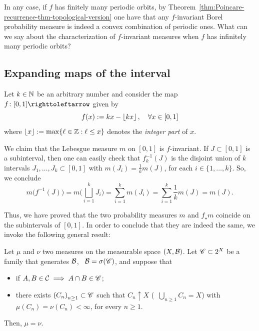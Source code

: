 In any case, if $f$ has finitely many periodic orbits, by Theorem~\ref{thm:Poincare-recurrence-thm-topological-version} one have that any $f$-invariant Borel probability measure is indeed a convex combination of periodic ones. What can we say about the characterization of $f$-invariant measures when $f$ has infinitely many periodic orbits?

\subsection{Expanding maps of the interval}\label{sec:expand-maps-interval}

Let $k\in\mathbb{N}$ be an arbitrary number and consider the map $f\colon [0,1]\carr$ given by
\begin{displaymath}
  f(x):=kx - \left\lfloor{kx}\right\rfloor, \quad\forall x\in [0,1]
\end{displaymath}
where $\left\lfloor{x}\right\rfloor:=\max\{\ell\in\mathbb{Z} : \ell\leq x\}$ denotes the \emph{integer part} of $x$.

We claim that the Lebesgue measure $m$ on $[0,1]$ is $f$-invariant. If $J\subset [0,1]$ is a subinterval, then one can easily check that $f^{-1}_{k}(J)$ is the disjoint union of $k$ intervals $J_{1},\ldots, J_{k}\subset [0,1]$ with $m(J_{i})=\frac{1}{k}m(J)$, for each $i\in\{1,\ldots, k\}$. So, we conclude
\begin{displaymath}
  m\big(f^{-1}(J)\big) = m\bigg(\bigsqcup_{i=1}^{k}J_{i}\bigg) = \sum_{i=1}^{k} m(J_{i}) = \sum_{i=1}^{k} \frac{1}{k} m(J) = m(J).
\end{displaymath}

Thus, we have proved that the two probability measures $m$ and $f_{\star}m$ coincide on the subintervals of $[0,1]$. In order to conclude that they are indeed the same, we invoke the following general result:

\begin{theorem}\label{thm:uniqueness-measures}
Let $\mu$ and $\nu$ two measures on the measurable space $(X,\mathcal{B})$. Let $\mathscr{C}\subset 2^{X}$ be a family that generates $\mathcal{B}$, \ie~$\mathcal{B}=\sigma(\mathscr{C})$, and suppose that
  \begin{itemize}
    \item if $A,B\in\mathcal{C}\implies A\cap B\in\mathscr{C}$;
    \item there exists ${(C_{n})}_{n\geq 1}\subset\mathscr{C}$ such that $C_{n}\uparrow X$ (\ie~$\bigcup_{n\geq 1} C_{n}=X$) with $\mu(C_{n})=\nu(C_{n})<\infty$, for every $n\geq 1$.
  \end{itemize}

  Then, $\mu=\nu$.
\end{theorem}

